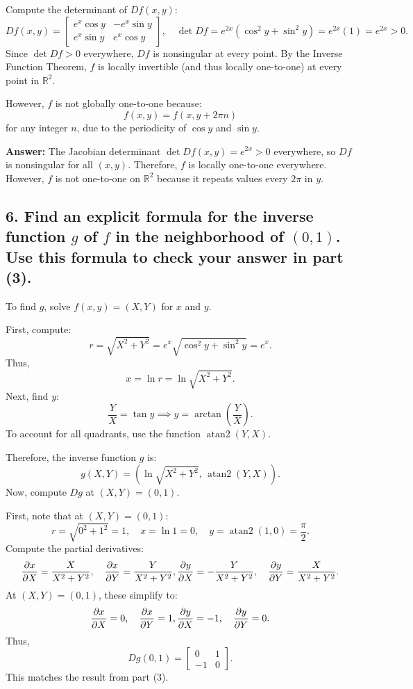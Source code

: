 \documentclass[lang=en,11pt]{template}
\begin{document}
Compute the determinant of \( Df(x, y) \):
\[
Df(x, y) = \begin{bmatrix}
e^x \cos y & -e^x \sin y \\
e^x \sin y & e^x \cos y
\end{bmatrix}, \quad
\det Df = e^{2x} (\cos^2 y + \sin^2 y) = e^{2x} (1) = e^{2x} > 0.
\]
Since \( \det Df > 0 \) everywhere, \( Df \) is nonsingular at every point. By the Inverse Function Theorem, \( f \) is locally invertible (and thus locally one-to-one) at every point in \( \mathbb{R}^2 \).

However, \( f \) is not globally one-to-one because:
\[
f(x, y) = f(x, y + 2\pi n)
\]
for any integer \( n \), due to the periodicity of \( \cos y \) and \( \sin y \).

\textbf{Answer:} The Jacobian determinant \( \det Df(x, y) = e^{2x} > 0 \) everywhere, so \( Df \) is nonsingular for all \( (x, y) \). Therefore, \( f \) is locally one-to-one everywhere. However, \( f \) is not one-to-one on \( \mathbb{R}^2 \) because it repeats values every \( 2\pi \) in \( y \).

\subsection*{6. Find an explicit formula for the inverse function \( g \) of \( f \) in the neighborhood of \( (0, 1) \). Use this formula to check your answer in part (3).}

To find \( g \), solve \( f(x, y) = (X, Y) \) for \( x \) and \( y \).

First, compute:
\[
r = \sqrt{X^2 + Y^2} = e^x \sqrt{\cos^2 y + \sin^2 y} = e^x.
\]
Thus,
\[
x = \ln r = \ln \sqrt{X^2 + Y^2}.
\]
Next, find \( y \):
\[
\frac{Y}{X} = \tan y \implies y = \arctan\left( \frac{Y}{X} \right).
\]
To account for all quadrants, use the function \( \operatorname{atan2}(Y, X) \).

Therefore, the inverse function \( g \) is:
\[
g(X, Y) = \left( \ln \sqrt{X^2 + Y^2}, \, \operatorname{atan2}(Y, X) \right).
\]
Now, compute \( Dg \) at \( (X, Y) = (0, 1) \).

First, note that at \( (X, Y) = (0, 1) \):
\[
r = \sqrt{0^2 + 1^2} = 1, \quad x = \ln 1 = 0, \quad y = \operatorname{atan2}(1, 0) = \frac{\pi}{2}.
\]
Compute the partial derivatives:
\[
\frac{\partial x}{\partial X} = \frac{X}{X^2 + Y^2}, \quad \frac{\partial x}{\partial Y} = \frac{Y}{X^2 + Y^2}, \\
\frac{\partial y}{\partial X} = -\frac{Y}{X^2 + Y^2}, \quad \frac{\partial y}{\partial Y} = \frac{X}{X^2 + Y^2}.
\]
At \( (X, Y) = (0, 1) \), these simplify to:
\[
\frac{\partial x}{\partial X} = 0, \quad \frac{\partial x}{\partial Y} = 1, \\
\frac{\partial y}{\partial X} = -1, \quad \frac{\partial y}{\partial Y} = 0.
\]
Thus,
\[
Dg(0, 1) = \begin{bmatrix}
0 & 1 \\
-1 & 0
\end{bmatrix}.
\]
This matches the result from part (3).
\end{document}
